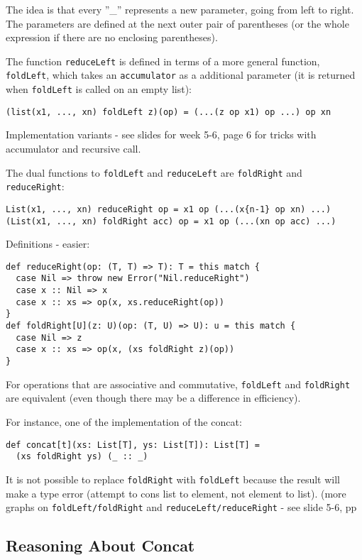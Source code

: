 \documentclass{scrartcl}
\newcommand{\term}[1]{\verb~#1~} %
\begin{document}
The idea is that every ''\_'' represents a new parameter, going from left to
right. The parameters are defined at the next outer pair of parentheses (or the
whole expression if there are no enclosing parentheses).

The function \lstinline|reduceLeft| is defined in terms of a more general
function, \lstinline|foldLeft|, which takes an \term{accumulator} as a
additional parameter (it is returned when \lstinline|foldLeft| is called on an
empty list):
\begin{lstlisting}
(list(x1, ..., xn) foldLeft z)(op) = (...(z op x1) op ...) op xn
\end{lstlisting}
Implementation variants - see slides for week 5-6, page 6 for tricks with
accumulator and recursive call.

The dual functions to \lstinline|foldLeft| and \lstinline|reduceLeft| are
\lstinline|foldRight| and \lstinline|reduceRight|:
\begin{lstlisting}
List(x1, ..., xn) reduceRight op = x1 op (...(x{n-1} op xn) ...)
(List(x1, ..., xn) foldRight acc) op = x1 op (...(xn op acc) ...)
\end{lstlisting}
Definitions - easier:
\begin{lstlisting}
def reduceRight(op: (T, T) => T): T = this match {
  case Nil => throw new Error("Nil.reduceRight")
  case x :: Nil => x
  case x :: xs => op(x, xs.reduceRight(op))
}
def foldRight[U](z: U)(op: (T, U) => U): u = this match {
  case Nil => z
  case x :: xs => op(x, (xs foldRight z)(op))
}
\end{lstlisting}
For operations that are associative and commutative, \lstinline|foldLeft| and
\lstinline|foldRight| are equivalent (even though there may be a difference in
efficiency).

For instance, one of the implementation of the concat:
\begin{lstlisting}
def concat[t](xs: List[T], ys: List[T]): List[T] =
  (xs foldRight ys) (_ :: _)
\end{lstlisting}
It is not possible to replace \lstinline|foldRight| with \lstinline|foldLeft|
because the result will make a type error (attempt to cons list to element, not
element to list). (more graphs on \lstinline|foldLeft/foldRight| and
\lstinline|reduceLeft/reduceRight| - see slide 5-6, pp

\subsection{Reasoning About Concat}
\label{sec:Concat}
\end{document}
